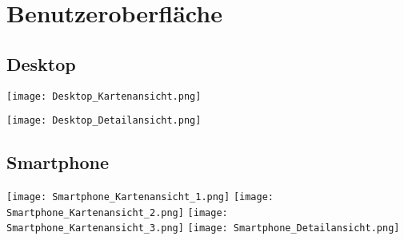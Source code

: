 \section{Benutzeroberfläche}

\subsection{Desktop}
    \texttt{[image: Desktop\_Kartenansicht.png]}


    \texttt{[image: Desktop\_Detailansicht.png]}

\subsection{Smartphone}
\begin{center}
    \texttt{[image: Smartphone\_Kartenansicht\_1.png]}
    \newpage
    \texttt{[image: Smartphone\_Kartenansicht\_2.png]}
    \newpage
    \texttt{[image: Smartphone\_Kartenansicht\_3.png]}
    \newpage
    \texttt{[image: Smartphone\_Detailansicht.png]}
\end{center}
